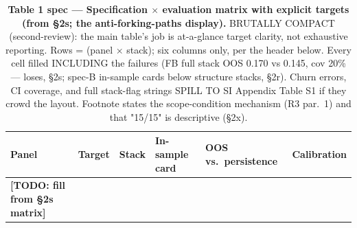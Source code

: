 \documentclass[9pt,twocolumn,twoside]{pnas-new}
\newcommand{\todo}[1]{\textcolor{red!65!black}{\textbf{[TODO: #1]}}}
\begin{document}
\begin{table}[p]
\centering
\caption{\textbf{Table 1 spec — Specification $\times$ evaluation matrix
with explicit targets (from \S2s; the anti-forking-paths display).}
BRUTALLY COMPACT (second-review): the main table's job is at-a-glance
target clarity, not exhaustive reporting. Rows = (panel $\times$ stack);
six columns only, per the header below. Every cell filled INCLUDING the
failures (FB full stack OOS 0.170 vs 0.145, cov 20\% — loses, \S2s;
spec-B in-sample cards below structure stacks, \S2r). Churn errors, CI
coverage, and full stack-flag strings SPILL TO SI Appendix Table S1 if
they crowd the layout. Footnote states the scope-condition mechanism
(R3 par.\ 1) and that "15/15" is descriptive (\S2x).}
\begin{tabular}{llllll}
Panel & Target & Stack & In-sample card & OOS vs.\ persistence & Calibration \\
\hline
\todo{fill from \S2s matrix} & & & & & \\
\end{tabular}
\label{tab:stacks}
\end{table}

\newpage
\end{document}
